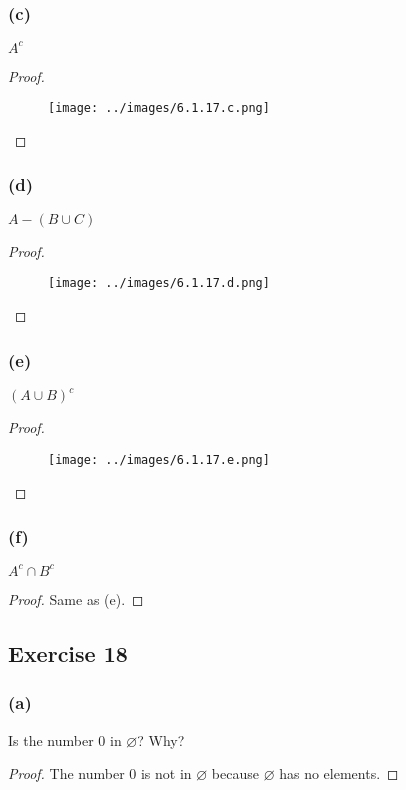 \documentclass[14pt]{extarticle}
\newcommand{\es}{\varnothing}
\begin{document}
\subsubsection{(c)}
$A^c$

\begin{proof}
  \begin{figure}[ht!]
    \centering
    \texttt{[image: ../images/6.1.17.c.png]}
  \end{figure}
\end{proof}

\subsubsection{(d)}
$A - (B \cup C)$

\begin{proof}
  \begin{figure}[ht!]
    \centering
    \texttt{[image: ../images/6.1.17.d.png]}
  \end{figure}
\end{proof}

\subsubsection{(e)}
$(A \cup B)^c$

\begin{proof}
  \begin{figure}[ht!]
    \centering
    \texttt{[image: ../images/6.1.17.e.png]}
  \end{figure}
\end{proof}

\subsubsection{(f)}
$A^c \cap B^c$

\begin{proof}
  Same as (e).
\end{proof}

\subsection{Exercise 18}

\subsubsection{(a)}
Is the number 0 in $\es$? Why?

\begin{proof}
  The number 0 is not in $\es$ because $\es$ has no elements.
\end{proof}
\end{document}
